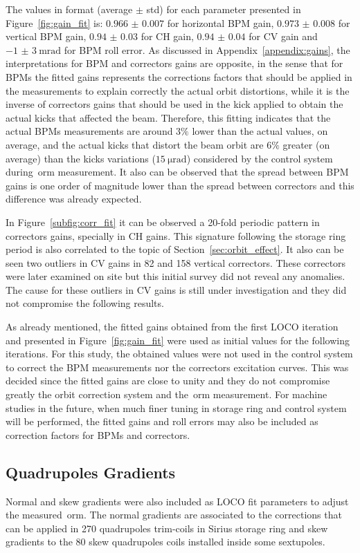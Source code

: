 The values in format (average $\pm$ std) for each parameter presented in Figure~\ref{fig:gain_fit} is: $\num{0.966(7)}$ for horizontal BPM gain, $\num{0.973(8)}$ for vertical BPM gain, $\num{0.94(3)}$ for CH gain, $\num{0.94(4)}$ for CV gain and $\SI{-1(3)}{\milli\radian}$ for BPM roll error. As discussed in Appendix~\ref{appendix:gains}, the interpretations for BPM and correctors gains are opposite, in the sense that for BPMs the fitted gains represents the corrections factors that should be applied in the measurements to explain correctly the actual orbit distortions, while it is the inverse of correctors gains that should be used in the kick applied to obtain the actual kicks that affected the beam. Therefore, this fitting indicates that the actual BPMs measurements are around $3\%$ lower than the actual values, on average, and the actual kicks that distort the beam orbit are $6\%$ greater (on average) than the kicks variations ($\SI{15}{\micro\radian}$) considered by the control system during~\gls{orm} measurement. It also can be observed that the spread between BPM gains is one order of magnitude lower than the spread between correctors and this difference was already expected.

In Figure~\ref{subfig:corr_fit} it can be observed a 20-fold periodic pattern in correctors gains, specially in CH gains. This signature following the storage ring period is also correlated to the topic of Section~\ref{sec:orbit_effect}. It also can be seen two outliers in CV gains in 82 and 158 vertical correctors. These correctors were later examined on site but this initial survey did not reveal any anomalies. The cause for these outliers in CV gains is still under investigation and they did not compromise the following results.

As already mentioned, the fitted gains obtained from the first LOCO iteration and presented in Figure~\ref{fig:gain_fit} were used as initial values for the following iterations. For this study, the obtained values were not used in the control system to correct the BPM measurements nor the correctors excitation curves. This was decided since the fitted gains are close to unity and they do not compromise greatly the orbit correction system and the~\gls{orm} measurement. For machine studies in the future, when much finer tuning in storage ring and control system will be performed, the fitted gains and roll errors may also be included as correction factors for BPMs and correctors.

\subsection{Quadrupoles Gradients}
Normal and skew gradients were also included as LOCO fit parameters to adjust the measured~\gls{orm}. The normal gradients are associated to the corrections that can be applied in 270 quadrupoles trim-coils in Sirius storage ring and skew gradients to the 80 skew quadrupoles coils installed inside some sextupoles.

